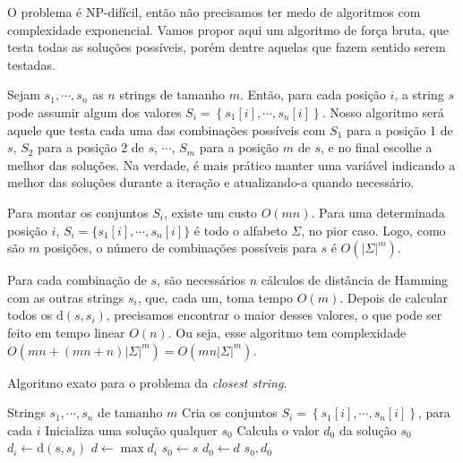 O problema é NP-difícil, então não precisamos ter medo de algoritmos com complexidade exponencial. Vamos propor aqui um algoritmo de força bruta, que testa todas as soluções possíveis, porém dentre aquelas que fazem sentido serem testadas.

Sejam $s_1, \cdots, s_n$ as $n$ strings de tamanho $m$. Então, para cada posição $i$, a string $s$ pode assumir algum dos valores $S_i = \left\{s_1[i], \cdots, s_n[i]\right\}$. Nosso algoritmo será aquele que testa cada uma das combinações possíveis com $S_1$ para a posição 1 de $s$, $S_2$ para a posição 2 de $s$, $\cdots$, $S_m$ para a posição $m$ de $s$, e no final escolhe a melhor das soluções. Na verdade, é mais prático manter uma variável indicando a melhor das soluções durante a iteração e atualizando-a quando necessário.

Para montar os conjuntos $S_i$, existe um custo $O(mn)$. Para uma determinada posição $i$, $S_i = \{s_1[i], \cdots, s_n[i]\}$ é todo o alfabeto $\Sigma$, no pior caso. Logo, como são $m$ posições, o número de combinações possíveis para $s$ é $O(|\Sigma|^m)$.

Para cada combinação de $s$, são necessários $n$ cálculos de distância de Hamming com as outras strings $s_i$, que, cada um, toma tempo $O(m)$.
Depois de calcular todos os $\text{d}(s, s_i)$, precisamos encontrar o maior desses valores, o que pode ser feito em tempo linear $O(n)$.
Ou seja, esse algoritmo tem complexidade $O(mn + (mn+n)|\Sigma|^m) = O(mn|\Sigma|^m)$.

\begin{algorithm}
    \caption{Algoritmo exato para o problema da \textit{closest string}.}
    \label{alg:exact}
    \begin{algorithmic}
        \Require Strings $s_1, \cdots, s_n$ de tamanho $m$
        \State Cria os conjuntos $S_i = \left\{s_1[i], \cdots, s_n[i]\right\}$, para cada $i$
        \State Inicializa uma solução qualquer $s_0$
        \State Calcula o valor $d_0$ da solução $s_0$
                \State $d_i \gets \text{d}(s, s_i)$
            \EndFor
            \State $d \gets \max d_i$
                \State $s_0 \gets s$
                \State $d_0 \gets d$
            \EndIf
        \EndFor
        \State \Return $s_0, d_0$
    \end{algorithmic}
\end{algorithm}
